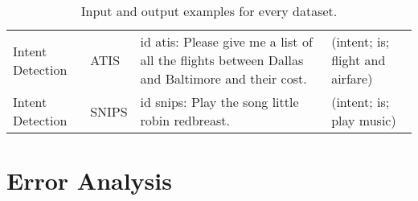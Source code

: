 \begin{table*}[]
{\begin{tabular}{@{}p{2.7cm}lp{10.5cm}p{10.5cm}@{}}
                                                        \\ \midrule
Intent Detection                     & ATIS             & \quad id atis: Please give me a list of all the {\color{black}flights} between Dallas and Baltimore and their {\color{black}cost}.            
                                                        &   (intent; is; {\color{orange}flight and airfare})              
                                                        \\
Intent Detection                     & SNIPS            & \quad id snips: Play the song little robin redbreast.             
                                                        &  (intent; is; {\color{orange}play music})               
                                                        \\ \bottomrule
\end{tabular}
}
\caption{{Input and output examples for every dataset.}}
\label{tab:datasetexamples}
\end{table*} 
\section{Error Analysis}

